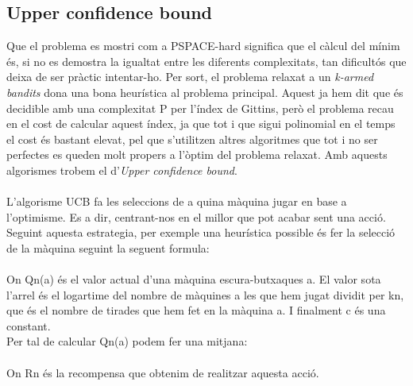 
	\subsection{Upper confidence bound}
	Que el problema es mostri com a PSPACE-hard significa que el càlcul del mínim és, si no es demostra la igualtat entre
	les diferents complexitats, tan dificultós que deixa de ser pràctic intentar-ho. Per sort, el problema relaxat a un
	\textit{k-armed bandits} dona una bona heurística al problema principal. Aquest ja hem dit que és decidible amb una complexitat P
	 per l'índex de Gittins, però el problema recau en el cost de calcular aquest índex, ja que tot i que sigui polinomial en el temps
	el cost és bastant elevat, pel que s'utilitzen altres algoritmes que tot i no ser perfectes es queden molt propers a l'òptim del 
	problema relaxat. Amb aquests algorismes trobem el d'\textit{Upper confidence bound}. \\
	\\
	L'algorisme UCB fa les seleccions de a quina màquina jugar en base a l'optimisme. Es a dir, centrant-nos en el millor que pot acabar sent una acció.
	Seguint aquesta estrategia, per exemple una heurística possible és fer la selecció de la màquina seguint la seguent formula:\\\\ %
	On Qn(a) és el valor actual d'una màquina escura-butxaques a. El valor sota l'arrel és el logartime del nombre de màquines a les que hem jugat dividit per kn, que és el nombre de tirades que hem fet en la màquina a. I finalment c és una constant.\\
	Per tal de calcular Qn(a) podem fer una mitjana:\\\\ %
	On Rn és la recompensa que obtenim de realitzar aquesta acció.\\\\
